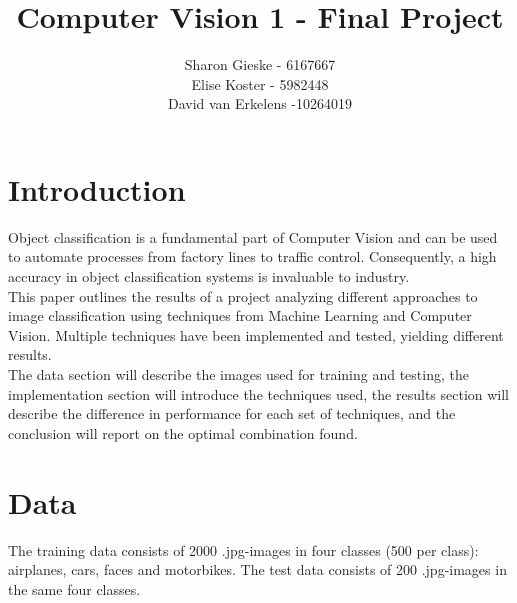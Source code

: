 \documentclass[12pt,a4paper]{article}
\title{Computer Vision 1 - Final Project}
\author{
Sharon Gieske - 6167667\\
Elise Koster - 5982448\\
David van Erkelens -10264019\\
}
\date{}
\begin{document}
\maketitle
\section{Introduction}
Object classification is a fundamental part of Computer Vision and can be used to automate processes from factory lines to traffic control. Consequently, a high accuracy in object classification systems is invaluable to industry.\\
This paper outlines the results of a project analyzing different approaches to image classification using techniques from Machine Learning and Computer Vision. Multiple techniques have been implemented and tested, yielding different results.\\
The data section will describe the images used for training and testing, the implementation section will introduce the techniques used, the results section will describe the difference in performance for each set of techniques, and the conclusion will report on the optimal combination found.

\section{Data}
The training data consists of 2000 .jpg-images in four classes (500 per class): airplanes, cars, faces and motorbikes. The test data consists of 200 .jpg-images in the same four classes.
\end{document}
